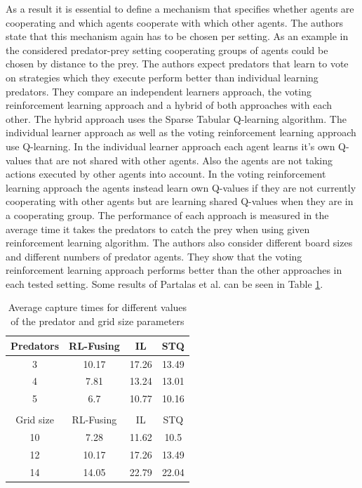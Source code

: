 \documentclass[conference]{IEEEtran}
\begin{document}
\newline
As a result it is essential to define a mechanism that specifies whether agents are cooperating and which agents cooperate with which other agents. The authors state that this mechanism again has to be chosen per setting. As an example in the considered predator-prey setting cooperating groups of agents could be chosen by distance to the prey.
\newline
The authors expect predators that learn to vote on strategies which they execute perform better than individual learning predators. They compare an independent learners approach, the voting reinforcement learning approach and a hybrid of both approaches with each other.
The hybrid approach uses the Sparse Tabular Q-learning algorithm.
The individual learner approach as well as the voting reinforcement learning approach use Q-learning.
In the individual learner approach each agent learns it's own Q-values that are not shared with other agents. Also the agents are not taking actions executed by other agents into account.
In the voting reinforcement learning approach the agents instead learn own Q-values if they are not currently cooperating with other agents but are learning shared Q-values when they are in a cooperating group.
The performance of each approach is measured in the average time it takes the predators to catch the prey when using given reinforcement learning algorithm.
The authors also consider different board sizes and different numbers of predator agents. They show that the voting reinforcement learning approach performs better than the other approaches in each tested setting. Some results of Partalas et al. \cite{partalas2008hybrid} can be seen in Table \ref{table:AvgCaptureTimes}.

\begin{table}[tb]
    \centering
    \caption{Average capture times for different values of the predator and grid size parameters}
    \begin{tabular}{c c c c}
        \hline
        Predators & RL-Fusing & IL & STQ \\
        \hline
        3 & 10.17 & 17.26 & 13.49 \\
        4 & 7.81 & 13.24 & 13.01 \\
        5 & 6.7 & 10.77 & 10.16 \\
        \hline
        \\
        \hline
        Grid size & RL-Fusing & IL & STQ \\
        \hline
        10 & 7.28 & 11.62 & 10.5 \\
        12 & 10.17 & 17.26 & 13.49 \\
        14 & 14.05 & 22.79 & 22.04 \\
        \hline
    \end{tabular}
    \label{table:AvgCaptureTimes}
\end{table}
\end{document}
